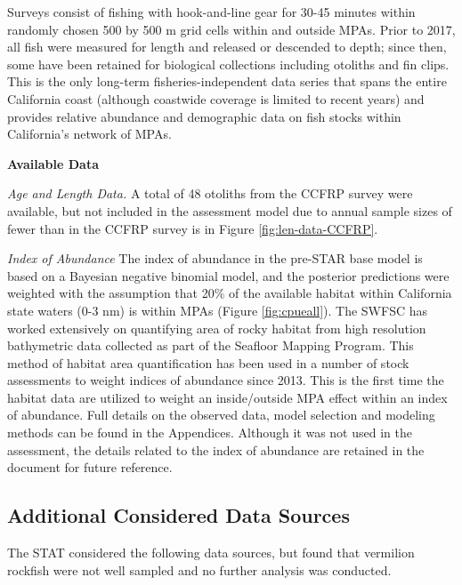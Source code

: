 \documentclass[11pt,
  english,
]{article}
\begin{document}
Surveys consist of fishing with hook-and-line gear for 30-45 minutes within randomly chosen 500 by 500 m grid cells within and outside MPAs. Prior to 2017, all fish were measured for length and released or descended to depth; since then, some have been retained for biological collections including otoliths and fin clips. This is the only long-term fisheries-independent data series that spans the entire California coast (although coastwide coverage is limited to recent years) and provides relative abundance and demographic data on fish stocks within California's network of MPAs.

\textbf{Available Data}

\emph{Age and Length Data.} A total of 48 otoliths from the CCFRP survey were available, but not included in the assessment model due to annual sample sizes of fewer than in the CCFRP survey is in Figure \ref{fig:len-data-CCFRP}.

\emph{Index of Abundance} The index of abundance in the pre-STAR base model is based on a Bayesian negative binomial model, and the posterior predictions were weighted with the assumption that 20\% of the available habitat within California state waters (0-3 nm) is within MPAs (Figure \ref{fig:cpueall}). The SWFSC has worked extensively on quantifying area of rocky habitat from high resolution bathymetric data collected as part of the Seafloor Mapping Program. This method of habitat area quantification has been used in a number of stock assessments to weight indices of abundance since 2013. This is the first time the habitat data are utilized to weight an inside/outside MPA effect within an index of abundance. Full details on the observed data, model selection and modeling methods can be found in the Appendices. Although it was not used in the assessment, the details related to the index of abundance are retained in the document for future reference.


\hypertarget{additional-considered-data-sources}{%
\subsection{Additional Considered Data Sources}\label{additional-considered-data-sources}}

\leavevmode\tagmcend\tagstructend

The STAT considered the following data sources, but found that vermilion rockfish were not well sampled and no further analysis was conducted.
\end{document}
